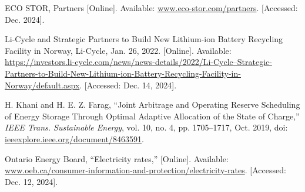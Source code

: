 \documentclass[conference]{IEEEtran}
\begin{document}
\begin{thebibliography}{00}
 ECO STOR, Partners [Online]. Available: \href{https://www.eco-stor.com/partners}{www.eco-stor.com/partners}. [Accessed: Dec. 2024].

 Li-Cycle and Strategic Partners to Build New Lithium-ion Battery Recycling Facility in Norway, Li-Cycle, Jan. 26, 2022. [Online]. Available: \href{https://investors.li-cycle.com/news/news-details/2022/Li-Cycle--Strategic-Partners-to-Build-New-Lithium-ion-Battery-Recycling-Facility-in-Norway/default.aspx}{https://investors.li-cycle.com/news/news-details/2022/Li-Cycle--Strategic-Partners-to-Build-New-Lithium-ion-Battery-Recycling-Facility-in-Norway/default.aspx}. [Accessed: Dec. 14, 2024].

 H. Khani and H. E. Z. Farag, ``Joint Arbitrage and Operating Reserve Scheduling of Energy Storage Through Optimal Adaptive Allocation of the State of Charge,'' \textit{IEEE Trans. Sustainable Energy}, vol. 10, no. 4, pp. 1705--1717, Oct. 2019, doi: \href{https://ieeexplore.ieee.org/document/8463591}{ieeexplore.ieee.org/document/8463591}.

Ontario Energy Board, ``Electricity rates,'' [Online]. Available: \href{https://www.oeb.ca/consumer-information-and-protection/electricity-rates}{www.oeb.ca/consumer-information-and-protection/electricity-rates}. [Accessed: Dec. 12, 2024].


\end{thebibliography}
\end{document}
